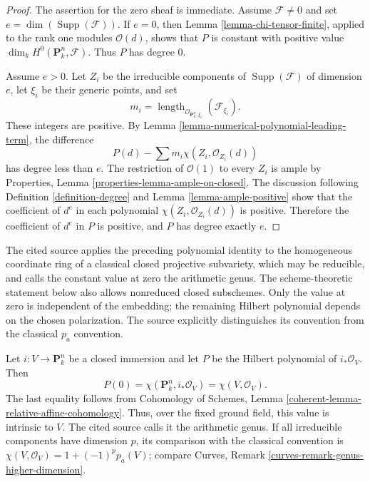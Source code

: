 \begin{proof}
The assertion for the zero sheaf is immediate. Assume $\mathcal{F} \not = 0$
and set $e = \dim(\operatorname{Supp}(\mathcal{F}))$. If $e = 0$, then
Lemma \ref{lemma-chi-tensor-finite}, applied to the rank one modules
$\mathcal{O}(d)$, shows that $P$ is constant with positive value
$\dim_k H^0(\mathbf{P}^n_k, \mathcal{F})$. Thus $P$ has degree $0$.

Assume $e > 0$. Let $Z_i$ be the irreducible components of
$\operatorname{Supp}(\mathcal{F})$ of dimension $e$, let $\xi_i$ be their
generic points, and set
$$
m_i = \operatorname{length}_{\mathcal{O}_{\mathbf{P}^n_k, \xi_i}}
(\mathcal{F}_{\xi_i}).
$$
These integers are positive. By
Lemma \ref{lemma-numerical-polynomial-leading-term}, the difference
$$
P(d) - \sum m_i\chi(Z_i, \mathcal{O}_{Z_i}(d))
$$
has degree less than $e$. The restriction of $\mathcal{O}(1)$ to every
$Z_i$ is ample by Properties, Lemma
\ref{properties-lemma-ample-on-closed}. The discussion following Definition
\ref{definition-degree} and Lemma \ref{lemma-ample-positive} show that the
coefficient of $d^e$ in each polynomial
$\chi(Z_i, \mathcal{O}_{Z_i}(d))$ is positive. Therefore the coefficient of
$d^e$ in $P$ is positive, and $P$ has degree exactly $e$.
\end{proof}

\begin{remark}
\label{remark-FAC-arithmetic-genus}
\begin{reference}
\cite[Chapter III, \S 6, no. 80, Proposition 5 and Remarks 1--3,
p. 276]{FAC}
\end{reference}
\begin{history}
The cited source applies the preceding polynomial identity to the homogeneous
coordinate ring of a classical closed projective subvariety, which may be
reducible, and calls the constant value at zero the arithmetic genus. The
scheme-theoretic statement below also allows nonreduced closed subschemes.
Only the value at zero is independent of the embedding; the remaining
Hilbert polynomial depends on the chosen polarization. The source explicitly
distinguishes its convention from the classical $p_a$ convention.
\end{history}
Let $i : V \to \mathbf{P}^n_k$ be a closed immersion and let $P$ be the
Hilbert polynomial of $i_*\mathcal{O}_V$. Then
$$
P(0) = \chi(\mathbf{P}^n_k, i_*\mathcal{O}_V)
= \chi(V, \mathcal{O}_V).
$$
The last equality follows from Cohomology of Schemes, Lemma
\ref{coherent-lemma-relative-affine-cohomology}. Thus, over the fixed ground
field, this value is intrinsic to $V$. The cited source calls it the
arithmetic genus. If all irreducible components have dimension $p$, its
comparison with the classical convention is
$\chi(V, \mathcal{O}_V) = 1 + (-1)^p p_a(V)$; compare Curves, Remark
\ref{curves-remark-genus-higher-dimension}.
\end{remark}



